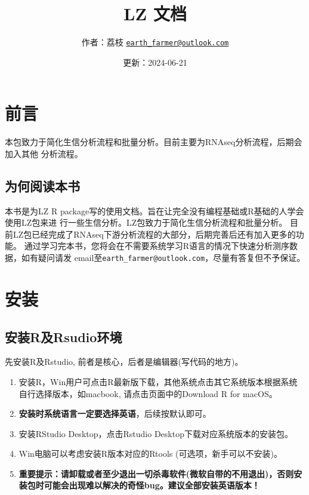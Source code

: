 \documentclass[
]{book}
\title{LZ 文档}
\author{作者：荔枝 \href{mailto:earth_farmer@outlook.com}{\nolinkurl{earth\_farmer@outlook.com}}}
\date{更新：2024-06-21}
\providecommand{\tightlist}{%
  \setlength{\itemsep}{0pt}\setlength{\parskip}{0pt}}
\begin{document}
\maketitle

{
\setcounter{tocdepth}{1}
\tableofcontents
}
\chapter*{前言}\label{ux524dux8a00}

本包致力于简化生信分析流程和批量分析。目前主要为RNAseq分析流程，后期会加入其他
分析流程。

\section*{为何阅读本书}\label{ux4e3aux4f55ux9605ux8bfbux672cux4e66}

本书是为LZ R package写的使用文档。旨在让完全没有编程基础或R基础的人学会使用LZ包来进
行一些生信分析。LZ包致力于简化生信分析流程和批量分析。
目前LZ包已经完成了RNAseq下游分析流程的大部分，后期完善后还有加入更多的功能。
通过学习完本书，您将会在不需要系统学习R语言的情况下快速分析测序数据，如有疑问请发
email至\texttt{earth\_farmer@outlook.com}，尽量有答复但不予保证。

\chapter{安装}\label{install}

\section{安装R及Rsudio环境}\label{ux5b89ux88c5rux53carsudioux73afux5883}

先安装R及Rstudio, 前者是核心，后者是编辑器(写代码的地方)。

\begin{enumerate}
\def\labelenumi{\arabic{enumi}.}
\tightlist
\item
  安装R，Win用户可点击R最新版下载，其他系统点击其它系统版本根据系统自行选择版本，如macbook, 请点击页面中的Download R for macOS。
\item
  \textbf{安装时系统语言一定要选择英语}，后续按默认即可。
\item
  安装RStudio Desktop，点击Rstudio Desktop下载对应系统版本的安装包。
\item
  Win电脑可以考虑安装R版本对应的Rtools (可选项，新手可以不安装)。
\item
  \textbf{重要提示：请卸载或者至少退出一切杀毒软件(微软自带的不用退出)，否则安装包时可能会出现难以解决的奇怪bug。建议全部安装英语版本！}
\end{enumerate}
\end{document}
